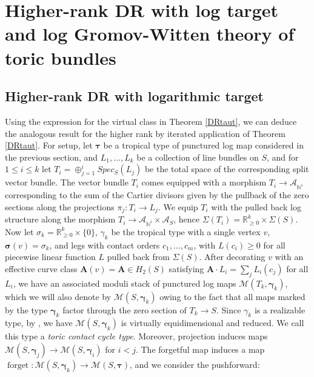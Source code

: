 \documentclass[12pt, oneside]{amsart}   	%
\newcounter{thm}
\newcommand{\NN}{\mathbb{N}}
\newcommand{\forget}{\operatorname{forget}}
\numberwithin{equation}{section}
\numberwithin{thm}{section}
\numberwithin{figure}{section}
\begin{document}
\section{Higher-rank DR with log target and log Gromov-Witten theory of toric bundles}

\subsection{Higher-rank DR with logarithmic target}
Using the expression for the virtual class in Theorem \ref{DRtaut}, we can deduce the analogous result for the higher rank by iterated application of Theorem \ref{DRtaut}. For setup, let $\pmb\tau$ be a tropical type of punctured log map considered in the previous section, and $L_1,\ldots,L_{k}$ be a collection of line bundles on $S$, and for $1\le i\le k$ let $T_i = \oplus_{j=1}^i Spec_{S}(L_j)$ be the total space of the corresponding split vector bundle. The vector bundle $T_i$ comes equipped with a morphism $T_i \rightarrow \mathcal{A}_{\NN^i}$ corresponding to the sum of the Cartier divisors given by the pullback of the zero sections along the projections $\pi_j: T_i \rightarrow L_j$. We equip $T_i$ with the pulled back log structure along the morphism $T_i \rightarrow \mathcal{A}_{\NN^i} \times \mathcal{A}_S$, hence $\Sigma(T_i) = \mathbb{R}^k_{\ge 0} \times \Sigma(S)$. Now let $\sigma_k = \mathbb{R}^k_{\ge 0} \times \{0\}$, $\gamma_{k}$ be the tropical type with a single vertex $v$, $\pmb\sigma(v) = \sigma_k$, and legs with contact orders $c_1,\ldots,c_m$, with $L(c_i)\ge 0$ for all piecewise linear function $L$ pulled back from $\Sigma(S)$. After decorating $v$ with an effective curve class $\textbf{A}(v) = \textbf{A} \in H_2(S)$ satisfying $\textbf{A}\cdot L_i = \sum_j L_i(c_j)$ for all $L_i$, we have an associated moduli stack of punctured log maps $\mathscr{M}(T_{k},\pmb\gamma_k)$, which we will also denote by $\mathscr{M}(S,\pmb\gamma_k)$ owing to the fact that all maps marked by the type $\pmb\gamma_k$ factor through the zero section of $T_k \rightarrow S$. Since $\gamma_k$ is a realizable type, by \cite[Proposition $3.30$]{punc}, we have $\mathscr{M}(S,\pmb\gamma_k)$ is virtually equidimensional and reduced. We call this type a \emph{toric contact cycle type}. Moreover, projection induces maps $\mathscr{M}(S,\pmb\gamma_j) \rightarrow \mathscr{M}(S,\pmb\gamma_i)$ for $i < j$. The forgetful map induces a map $\forget: \mathscr{M}(S,\pmb\gamma_k) \rightarrow \mathscr{M}(S,\pmb\tau)$, and we consider the pushforward:
\end{document}
